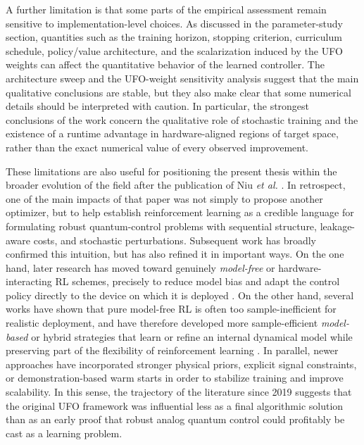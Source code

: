 A further limitation is that some parts of the empirical assessment remain sensitive to implementation-level choices. As discussed in the parameter-study section, quantities such as the training horizon, stopping criterion, curriculum schedule, policy/value architecture, and the scalarization induced by the UFO weights can affect the quantitative behavior of the learned controller. The architecture sweep and the UFO-weight sensitivity analysis suggest that the main qualitative conclusions are stable, but they also make clear that some numerical details should be interpreted with caution. In particular, the strongest conclusions of the work concern the qualitative role of stochastic training and the existence of a runtime advantage in hardware-aligned regions of target space, rather than the exact numerical value of every observed improvement.

These limitations are also useful for positioning the present thesis within the broader evolution of the field after the publication of Niu \emph{et al.} \cite{Niu2019}. In retrospect, one of the main impacts of that paper was not simply to propose another optimizer, but to help establish reinforcement learning as a credible language for formulating robust quantum-control problems with sequential structure, leakage-aware costs, and stochastic perturbations. Subsequent work has broadly confirmed this intuition, but has also refined it in important ways. On the one hand, later research has moved toward genuinely \emph{model-free} or hardware-interacting RL schemes, precisely to reduce model bias and adapt the control policy directly to the device on which it is deployed \cite{Sivak2022}. On the other hand, several works have shown that pure model-free RL is often too sample-inefficient for realistic deployment, and have therefore developed more sample-efficient \emph{model-based} or hybrid strategies that learn or refine an internal dynamical model while preserving part of the flexibility of reinforcement learning \cite{Khalid2023}. In parallel, newer approaches have incorporated stronger physical priors, explicit signal constraints, or demonstration-based warm starts in order to stabilize training and improve scalability. In this sense, the trajectory of the literature since 2019 suggests that the original UFO framework was influential less as a final algorithmic solution than as an early proof that robust analog quantum control could profitably be cast as a learning problem.

